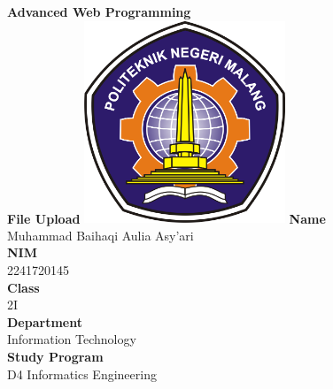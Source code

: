 \documentclass[12pt,titlepage]{article}
\newcommand{\vSubject}{Advanced Web Programming}
\newcommand{\vSubtitle}{File Upload}
\newcommand{\vName}{Muhammad Baihaqi Aulia Asy'ari}
\newcommand{\vNIM}{2241720145}
\newcommand{\vClass}{2I}
\newcommand{\vDepartment}{Information Technology}
\newcommand{\vStudyProgram}{D4 Informatics Engineering}
\begin{document}
\begin{titlepage}
    \centering
    \vfill
    {\bfseries\LARGE
        \vSubject\\
        \vskip0.25cm
        \vSubtitle
    }
    \vfill
    \includegraphics[width=6cm]{images/polinema-logo.png}
    \vfill
    {
        \textbf{Name}\\
        \vName\\
        \vskip0.5cm
        \textbf{NIM}\\
        \vNIM\\
        \vskip0.5cm
        \textbf{Class}\\
        \vClass\\
        \vskip0.5cm
        \textbf{Department}\\
        \vDepartment\\
        \vskip0.5cm
        \textbf{Study Program}\\
        \vStudyProgram
    }
\end{titlepage}

\newpage
\end{document}
